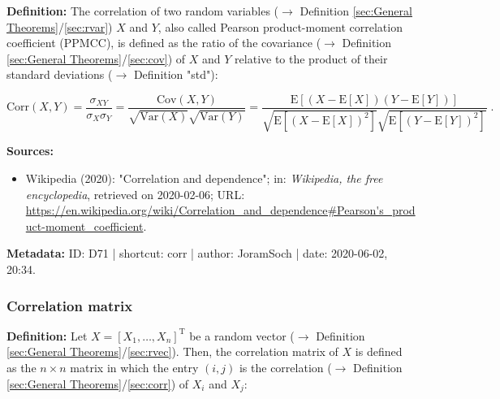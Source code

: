 \documentclass[a4paper,12pt,twoside]{book}
\begin{document}
\textbf{Definition:} The correlation of two random variables ($\rightarrow$ Definition \ref{sec:General Theorems}/\ref{sec:rvar}) $X$ and $Y$, also called Pearson product-moment correlation coefficient (PPMCC), is defined as the ratio of the covariance ($\rightarrow$ Definition \ref{sec:General Theorems}/\ref{sec:cov}) of $X$ and $Y$ relative to the product of their standard deviations ($\rightarrow$ Definition "std"):

\begin{equation} \label{eq:corr-corr}
\mathrm{Corr}(X,Y) = \frac{\sigma_{XY}}{\sigma_X \sigma_Y} = \frac{\mathrm{Cov}(X,Y)}{\sqrt{\mathrm{Var}(X)} \sqrt{\mathrm{Var}(Y)}} = \frac{\mathrm{E}\left[ (X-\mathrm{E}[X]) (Y-\mathrm{E}[Y]) \right]}{\sqrt{\mathrm{E}\left[ (X-\mathrm{E}[X])^2 \right]} \sqrt{\mathrm{E}\left[ (Y-\mathrm{E}[Y])^2 \right]}} \; .
\end{equation}


\vspace{1em}
\textbf{Sources:}
\begin{itemize}
\item Wikipedia (2020): "Correlation and dependence"; in: \textit{Wikipedia, the free encyclopedia}, retrieved on 2020-02-06; URL: \url{https://en.wikipedia.org/wiki/Correlation_and_dependence#Pearson's_product-moment_coefficient}.
\end{itemize}


\vspace{1em}
\textbf{Metadata:} ID: D71 | shortcut: corr | author: JoramSoch | date: 2020-06-02, 20:34.
\vspace{1em}



\subsubsection[\textit{Correlation matrix}]{Correlation matrix} \label{sec:corrmat}
\setcounter{equation}{0}

\textbf{Definition:} Let $X = [X_1, \ldots, X_n]^\mathrm{T}$ be a random vector ($\rightarrow$ Definition \ref{sec:General Theorems}/\ref{sec:rvec}). Then, the correlation matrix of $X$ is defined as the $n \times n$ matrix in which the entry $(i,j)$ is the correlation ($\rightarrow$ Definition \ref{sec:General Theorems}/\ref{sec:corr}) of $X_i$ and $X_j$:
\end{document}
